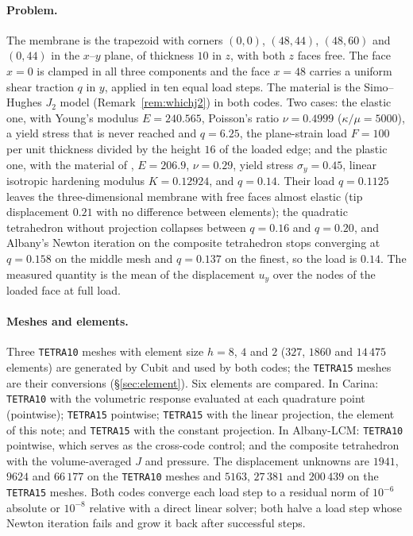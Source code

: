 \documentclass[11pt]{article}
\newcommand{\code}[1]{\texttt{#1}}
\theoremstyle{definition}
\theoremstyle{plain}
\begin{document}
\paragraph{Problem.} The membrane is the trapezoid with corners $(0, 0)$,
$(48, 44)$, $(48, 60)$ and $(0, 44)$ in the $x$--$y$ plane, of thickness
$10$ in $z$, with both $z$ faces free. The face $x = 0$ is clamped in all
three components and the face $x = 48$ carries a uniform shear traction $q$
in $y$, applied in ten equal load steps. The material is the Simo--Hughes
$J_2$ model (Remark~\ref{rem:whichj2}) in both codes. Two cases: the
elastic one, with Young's modulus $E = 240.565$, Poisson's ratio $\nu =
0.4999$ ($\kappa/\mu = 5000$), a yield stress that is never reached and
$q = 6.25$, the plane-strain load $F = 100$ per unit thickness divided by
the height $16$ of the loaded edge; and the plastic one, with the material
of \citet{SimoArmero:1992}, $E = 206.9$, $\nu = 0.29$, yield stress
$\sigma_y = 0.45$, linear isotropic hardening modulus $K = 0.12924$, and
$q = 0.14$. Their load $q = 0.1125$ leaves the three-dimensional membrane
with free faces almost elastic (tip displacement $0.21$ with no difference
between elements); the quadratic tetrahedron without projection collapses
between $q = 0.16$ and $q = 0.20$, and Albany's Newton iteration on the
composite tetrahedron stops converging at $q = 0.158$ on the middle mesh
and $q = 0.137$ on the finest, so the load is $0.14$. The measured quantity
is the mean of the displacement $u_y$ over the nodes of the loaded face at
full load.

\paragraph{Meshes and elements.} Three \code{TETRA10} meshes with element
size $h = 8$, $4$ and $2$ ($327$, $1860$ and $14\,475$ elements) are
generated by Cubit and used by both codes; the \code{TETRA15} meshes are
their conversions (\S\ref{sec:element}). Six elements are compared. In
Carina: \code{TETRA10} with the volumetric response evaluated at each
quadrature point (pointwise); \code{TETRA15} pointwise; \code{TETRA15}
with the linear projection, the element of this note; and \code{TETRA15}
with the constant projection. In Albany-LCM: \code{TETRA10} pointwise,
which serves as the cross-code control; and the composite tetrahedron with
the volume-averaged $J$ and pressure. The displacement unknowns are $1941$,
$9624$ and $66\,177$ on the \code{TETRA10} meshes and $5163$, $27\,381$ and
$200\,439$ on the \code{TETRA15} meshes. Both codes converge each load step
to a residual norm of $10^{-6}$ absolute or $10^{-8}$ relative with a
direct linear solver; both halve a load step whose Newton iteration fails
and grow it back after successful steps.
\end{document}
